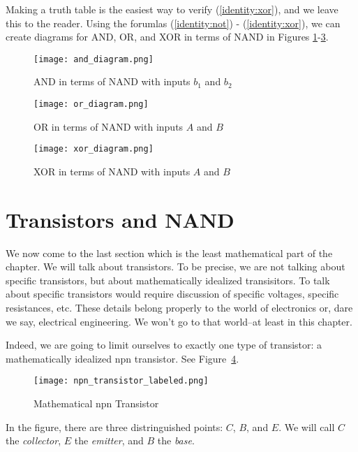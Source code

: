 Making a truth table is the easiest way to verify (\ref{identity:xor}), and we leave this to the reader.  Using the forumlas (\ref{identity:not}) - (\ref{identity:xor}), we can create diagrams for AND, OR, and XOR in terms of NAND in Figures \ref{figure:and_in_terms_of_nand}-\ref{figure:xor_in_terms_of_nand}.
\begin{figure}
	\begin{center}
	\texttt{[image: and\_diagram.png]}
\end{center}\caption{AND in terms of NAND with inputs $b_1$ and $b_2$}\label{figure:and_in_terms_of_nand}
\end{figure}
\begin{figure}
	\begin{center}
		\texttt{[image: or\_diagram.png]}
	\end{center}\caption{OR in terms of NAND with inputs $A$ and $B$}\label{figure:or_in_terms_of_nand}
\end{figure}
\begin{figure}
	\begin{center}
		\texttt{[image: xor\_diagram.png]}
	\end{center}\caption{XOR in terms of NAND with inputs $A$ and $B$}\label{figure:xor_in_terms_of_nand}
\end{figure}

\section{Transistors and NAND}

We now come to the last section which is the least mathematical part of the chapter.  We will talk about transistors.  To be precise, we are not talking about specific transistors, but about mathematically idealized transisitors.  To talk about specific transistors would require discussion of specific voltages, specific resistances, etc.  These details belong properly to the world of electronics or, dare we say, electrical engineering.  We won't go to that world--at least in this chapter.

Indeed, we are going to limit ourselves to exactly one type of transistor: a mathematically idealized npn transistor.  See Figure~\ref{figure:npn_transistor}. 
\begin{figure}
	\begin{center}
		\texttt{[image: npn\_transistor\_labeled.png]}
	\end{center}\caption{Mathematical npn Transistor}\label{figure:npn_transistor}
\end{figure}
In the figure, there are three distringuished points: $C$, $B$, and $E$.  We will call $C$ the \emph{collector}, $E$ the \emph{emitter}, and $B$ the \emph{base}.

